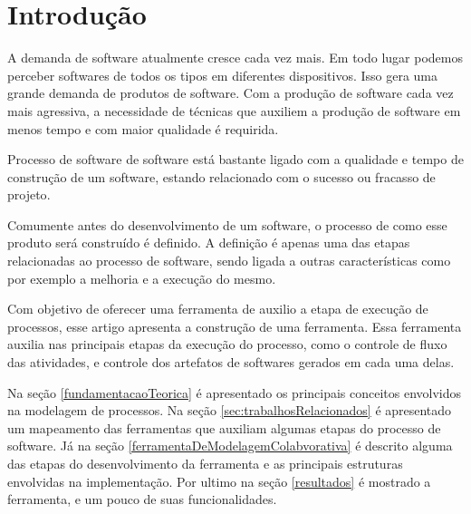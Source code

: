 \section{Introdução}\label{introducao}
A demanda de software atualmente cresce cada vez mais. Em todo lugar podemos perceber softwares de todos os tipos em diferentes dispositivos. Isso gera uma grande demanda de produtos de software. Com a produção de software cada vez mais agressiva, a necessidade de técnicas que auxiliem a produção de software em menos tempo e com maior qualidade é requirida\cite{larman2007utilizando}.

Processo de software de software está bastante ligado com a qualidade e tempo de construção de um software, estando relacionado com o sucesso ou fracasso de projeto\cite{sommerville2007engenharia}. 

Comumente antes do desenvolvimento de um software, o processo de como esse produto será construído é definido. A definição é apenas uma das etapas relacionadas ao processo de software, sendo ligada a outras características como por exemplo a melhoria e a execução do mesmo.

Com objetivo de oferecer uma ferramenta de auxilio a etapa de execução de processos, esse artigo apresenta a construção de uma ferramenta. Essa ferramenta auxilia nas principais etapas da execução do processo, como o controle de fluxo das atividades, e controle dos artefatos de softwares gerados em cada uma delas.

Na seção \ref{fundamentacaoTeorica} é apresentado os principais conceitos envolvidos na modelagem de processos. Na seção \ref{sec:trabalhosRelacionados} é apresentado um mapeamento das ferramentas que auxiliam algumas etapas do processo de software. Já na seção \ref{ferramentaDeModelagemColabvorativa} é descrito alguma das etapas do desenvolvimento da ferramenta e as principais estruturas envolvidas na implementação. Por ultimo na seção \ref{resultados} é mostrado a ferramenta, e um pouco de suas funcionalidades.